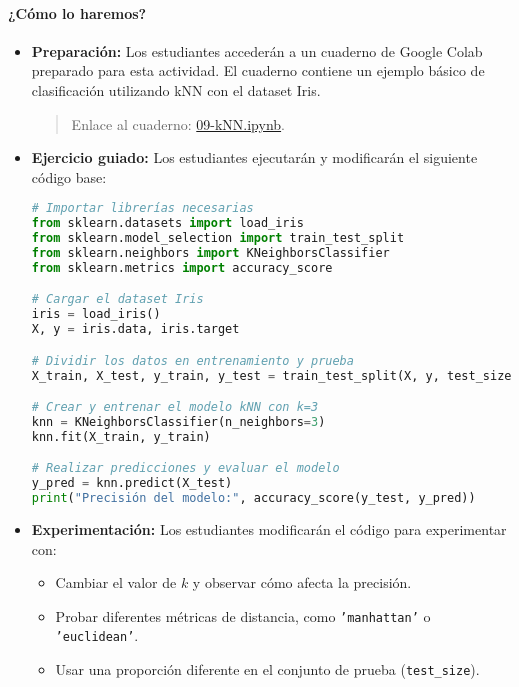 \documentclass[a4,11pt]{aleph-notas}
\begin{document}
\paragraph{¿Cómo lo haremos?}  
\begin{itemize}[leftmargin=*]
    \item \textbf{Preparación:}  
    Los estudiantes accederán a un cuaderno de Google Colab preparado para esta actividad. El cuaderno contiene un ejemplo básico de clasificación utilizando kNN con el dataset Iris.
    \begin{quote}
        Enlace al cuaderno: \href{https://colab.research.google.com/github/andres-merino/AprendizajeAutomaticoInicial-05-N0105/blob/main/2-Notebooks/09-kNN.ipynb}{09-kNN.ipynb}.
    \end{quote}

    \item \textbf{Ejercicio guiado:}  
    Los estudiantes ejecutarán y modificarán el siguiente código base:
\begin{pycodigo}
\begin{lstlisting}[language=Python]
# Importar librerías necesarias
from sklearn.datasets import load_iris
from sklearn.model_selection import train_test_split
from sklearn.neighbors import KNeighborsClassifier
from sklearn.metrics import accuracy_score

# Cargar el dataset Iris
iris = load_iris()
X, y = iris.data, iris.target

# Dividir los datos en entrenamiento y prueba
X_train, X_test, y_train, y_test = train_test_split(X, y, test_size=0.3, random_state=42)

# Crear y entrenar el modelo kNN con k=3
knn = KNeighborsClassifier(n_neighbors=3)
knn.fit(X_train, y_train)

# Realizar predicciones y evaluar el modelo
y_pred = knn.predict(X_test)
print("Precisión del modelo:", accuracy_score(y_test, y_pred))
\end{lstlisting}
\end{pycodigo}

    \item \textbf{Experimentación:}  
    Los estudiantes modificarán el código para experimentar con:
    \begin{itemize}[leftmargin=*]
        \item Cambiar el valor de \(k\) y observar cómo afecta la precisión.
        \item Probar diferentes métricas de distancia, como \texttt{'manhattan'} o \texttt{'euclidean'}.
        \item Usar una proporción diferente en el conjunto de prueba (\texttt{test\_size}).
    \end{itemize}
\end{itemize}
\end{document}
